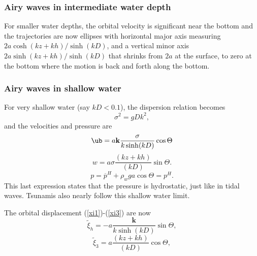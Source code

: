 \subsubsection{Airy waves in intermediate water depth}
For smaller water depths, the orbital velocity is significant near the bottom 
and the trajectories are now ellipses with horizontal major axis measuring 
$2 a
{\cosh\left(kz+kh\right)}/{\sinh\left(kD\right)}$, and 
a vertical minor axis $2 a
{\sinh\left(kz+kh\right)}/{\sinh\left(kD\right)}$ that shrinks from $2a$ at the surface, 
to zero at the bottom where the motion is back and forth along the 
bottom.

\subsubsection{Airy waves in shallow water}
For very shallow water  (say $kD < 0.1$), the dispersion relation 
becomes
\begin{equation}
    \sigma^2=g D  k^2,
     \label{dispersion shallow}
\end{equation}
and the velocities and pressure are 
\begin{equation}
    \ub=a{\mathbf k}\frac{\sigma}{k \sinh(k D)}
        \cos \Theta
\end{equation}
\begin{equation}
    w=a \sigma
    \frac{\left(kz+kh\right)}{\left(kD\right)}    \sin \Theta.
\end{equation}
\begin{equation}
    p=\overline{p}^H+ \rho_w g a     \cos \Theta = p^H.
\end{equation}
This last expression states that the pressure is hydrostatic, just like in 
tidal waves. Tsunamis also nearly follow this shallow water limit. 

 The orbital displacement (\ref{xi1})-(\ref{xi3})
are now
\begin{equation}
    \widetilde{\xi}_h=-a \frac{\mathbf k}{k \sinh(k D)}
    \sin \Theta,
\end{equation}
\begin{equation}
    \widetilde{\xi}_3= a \frac{\left(kz+kh\right)}{\left(kD\right)}  \cos \Theta,
\end{equation}

